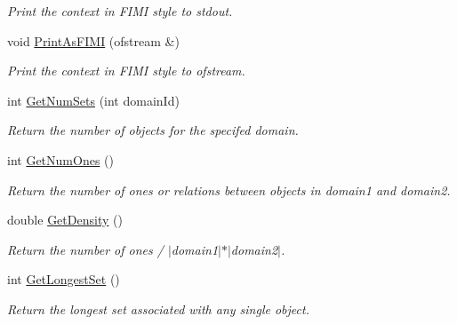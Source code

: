 \begin{DoxyCompactItemize}
\begin{DoxyCompactList}\small\item\em Print the context in FIMI style to stdout. \item\end{DoxyCompactList}\item 
\hypertarget{class_context_a15e5ec1fe7cddd0348c61f59733aed6e}{
void \hyperlink{class_context_a15e5ec1fe7cddd0348c61f59733aed6e}{PrintAsFIMI} (ofstream \&)}
\label{class_context_a15e5ec1fe7cddd0348c61f59733aed6e}

\begin{DoxyCompactList}\small\item\em Print the context in FIMI style to ofstream. \item\end{DoxyCompactList}\item 
\hypertarget{class_context_a17e73342fcd3d9cd96e2445e48c52275}{
int \hyperlink{class_context_a17e73342fcd3d9cd96e2445e48c52275}{GetNumSets} (int domainId)}
\label{class_context_a17e73342fcd3d9cd96e2445e48c52275}

\begin{DoxyCompactList}\small\item\em Return the number of objects for the specifed domain. \item\end{DoxyCompactList}\item 
\hypertarget{class_context_a54d9dcce403fb8f8f68118e6d420ce66}{
int \hyperlink{class_context_a54d9dcce403fb8f8f68118e6d420ce66}{GetNumOnes} ()}
\label{class_context_a54d9dcce403fb8f8f68118e6d420ce66}

\begin{DoxyCompactList}\small\item\em Return the number of ones or relations between objects in domain1 and domain2. \item\end{DoxyCompactList}\item 
\hypertarget{class_context_a1f3efbbcf1693d03bb6c4a8140312c83}{
double \hyperlink{class_context_a1f3efbbcf1693d03bb6c4a8140312c83}{GetDensity} ()}
\label{class_context_a1f3efbbcf1693d03bb6c4a8140312c83}

\begin{DoxyCompactList}\small\item\em Return the number of ones / $|$domain1$|$$\ast$$|$domain2$|$. \item\end{DoxyCompactList}\item 
\hypertarget{class_context_a87de3e29afbbfabe11791ed7da7357ed}{
int \hyperlink{class_context_a87de3e29afbbfabe11791ed7da7357ed}{GetLongestSet} ()}
\label{class_context_a87de3e29afbbfabe11791ed7da7357ed}

\begin{DoxyCompactList}\small\item\em Return the longest set associated with any single object. \item\end{DoxyCompactList}\end{DoxyCompactItemize}

